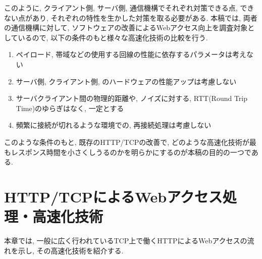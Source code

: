 \documentclass[twocolumn]{jsarticle}
\begin{document}
このように, クライアント側, サーバ側, 通信機構でそれぞれ対策できる点, できない点があり, それぞれの特性を生かした対策を取る必要がある.
本稿では, 両者の通信機構に対して, ソフトウェアの改善によるWebアクセス向上を調査対象としているので,
以下の条件のもと様々な高速化技術の比較を行う.
\begin{enumerate}
  \item ペイロード, 帯域などの使用する回線の性能に依存するパラメータは考えない
  \item サーバ側, クライアント側, のハードウェアの性能アップは考慮しない
  \item サーバクライアント間の物理的距離や, ノイズに対する, RTT(Round Trip Time)のゆらぎはなく, 一定とする
  \item 頻繁に接続が切れるような環境での, 再接続処理は考慮しない
\end{enumerate}
このような条件のもと, 既存のHTTP/TCPの改善で, どのような高速化技術が最もレスポンス時間を小さくしうるのかを明らかにするのが本稿の目的の一つである.

\section{HTTP/TCPによるWebアクセス処理・高速化技術}
本章では, 一般に広く行われているTCP上で働くHTTPによるWebアクセスの流れを示し, その高速化技術を紹介する.
\end{document}

